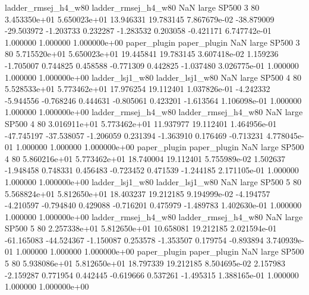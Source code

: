 ladder_rmsej_h4_w80 ladder_rmsej_h4_w80                   NaN      large    SP500                 3 80 3.453350e+01   5.650023e+01     13.946331      19.783145  7.867679e-02    -38.879009    -29.503972    -1.203733       0.232287 -1.283532   0.203058    -0.421171   6.747742e-01            1.000000        1.000000        1.000000e+00
       paper_plugin        paper_plugin                   NaN      large    SP500                 3 80 5.715520e+01   5.650023e+01     19.445841      19.783145  3.607418e-02      1.159236     -1.705007     0.744825       0.458588 -0.771309   0.442825    -1.037480   3.026775e-01            1.000000        1.000000        1.000000e+00
    ladder_lsj1_w80     ladder_lsj1_w80                   NaN      large    SP500                 4 80 5.528533e+01   5.773462e+01     17.976254      19.112401  1.037826e-01     -4.242332     -5.944556    -0.768246       0.444631 -0.805061   0.423201    -1.613564   1.106098e-01            1.000000        1.000000        1.000000e+00
ladder_rmsej_h4_w80 ladder_rmsej_h4_w80                   NaN      large    SP500                 4 80 3.016911e+01   5.773462e+01     11.937977      19.112401  1.464956e-01    -47.745197    -37.538057    -1.206059       0.231394 -1.363910   0.176469    -0.713231   4.778045e-01            1.000000        1.000000        1.000000e+00
       paper_plugin        paper_plugin                   NaN      large    SP500                 4 80 5.860216e+01   5.773462e+01     18.740004      19.112401  5.755989e-02      1.502637     -1.948458     0.748331       0.456483 -0.723452   0.471539    -1.244185   2.171105e-01            1.000000        1.000000        1.000000e+00
    ladder_lsj1_w80     ladder_lsj1_w80                   NaN      large    SP500                 5 80 5.568824e+01   5.812650e+01     18.403237      19.212185  9.194999e-02     -4.194757     -4.210597    -0.794840       0.429088 -0.716201   0.475979    -1.489783   1.402630e-01            1.000000        1.000000        1.000000e+00
ladder_rmsej_h4_w80 ladder_rmsej_h4_w80                   NaN      large    SP500                 5 80 2.257338e+01   5.812650e+01     10.658081      19.212185  2.021594e-01    -61.165083    -44.524367    -1.150087       0.253578 -1.353507   0.179754    -0.893894   3.740939e-01            1.000000        1.000000        1.000000e+00
       paper_plugin        paper_plugin                   NaN      large    SP500                 5 80 5.938086e+01   5.812650e+01     18.797339      19.212185  8.504695e-02      2.157983     -2.159287     0.771954       0.442445 -0.619666   0.537261    -1.495315   1.388165e-01            1.000000        1.000000        1.000000e+00
